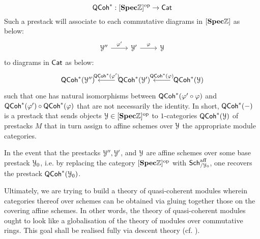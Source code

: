 \begin{definition}
\begin{enumerate}
                            $$\mathsf{QCoh}^*: [\mathbf{Spec} \mathbb{Z}]^{\mathrm{op}} \to \mathsf{Cat}$$
                        Such a prestack will associate to each commutative diagrams in $[\mathbf{Spec} \mathbb{Z}]$ as below:
                            $$
                                \begin{tikzcd}
                                	{\calY''} & {\calY'} & \calY
                                	\arrow["{\varphi'}", from=1-1, to=1-2]
                                	\arrow["\varphi", from=1-2, to=1-3]
                                \end{tikzcd}
                            $$
                        to diagrams in $\mathsf{Cat}$ as below:
                            $$
                                \begin{tikzcd}
                                	{\QCoh^*(\calY'')} & {\QCoh^*(\calY')} & {\QCoh^*(\calY)}
                                	\arrow["{\QCoh^*(\varphi')}"', from=1-2, to=1-1]
                                	\arrow["{\QCoh^*(\varphi)}"', from=1-3, to=1-2]
                                \end{tikzcd}
                            $$
                        such that one has natural isomorphisms between $\mathsf{QCoh}^*(\varphi' \circ \varphi)$ and $\mathsf{QCoh}^*(\varphi') \circ \mathsf{QCoh}^*(\varphi)$ that are not necessarily the identity. In short, $\mathsf{QCoh}^*(-)$ is a prestack that sends objects $\mathcal{Y} \in [\mathbf{Spec} \mathbb{Z}]^{\mathrm{op}}$ to $1$-categories $\mathsf{QCoh}^*(\mathcal{Y})$ of prestacks $M$ that in turn assign to affine schemes over $\mathcal{Y}$ the appropriate module categories. 
                        
                        In the event that the prestacks $\mathcal{Y}'', \mathcal{Y}'$, and $\mathcal{Y}$ are affine schemes over some base prestack $\mathcal{Y}_0$, i.e. by replacing the category $[\mathbf{Spec} \mathbb{Z}]^{\mathrm{op}}$ with $\mathsf{Sch}^{\mathrm{aff}}_{/\mathcal{Y}_0}$, one recovers the prestack $\mathsf{QCoh}^*(\mathcal{Y}_0)$. 
                    \end{enumerate}
                \end{definition}
                \begin{remark}
                    Ultimately, we are trying to build a theory of quasi-coherent modules wherein categories thereof over schemes can be obtained via gluing together those on the covering affine schemes. In other words, the theory of quasi-coherent modules ought to look like a globalisation of the theory of modules over commutative rings. This goal shall be realised fully via descent theory (cf. \cite{vistoli_descent}).
                \end{remark}
